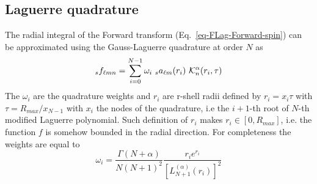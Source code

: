 \documentclass[a4paper,11pt]{article}
\begin{document}
\subsection{Laguerre quadrature}
\label{sec-Lag-quadrature}
%
The radial integral of the Forward transform (Eq.~\ref{eq-FLag-Forward-spin}) can be approximated using the Gauss-Laguerre quadrature at order $N$ as 
\begin{equation}
{}_s f_{\ell m n} = \sum_{i=0}^{N-1} \omega_i\ {}_s a_{\ell m}(r_i)\ {\cal K}^\alpha_n(r_i,\tau)
\label{eq-Lag-analyse-quadra}
\end{equation}
The $\omega_i$ are the quadrature weights and $r_i$ are r-shell radii defined by $r_i = x_i \tau$ with $\tau = R_{max}/x_{N-1}$ with $x_i$ the  nodes of the quadrature, i.e the $i+1$-th root of $N$-th  modified Laguerre polynomial. Such definition of $r_i$ makes $r_i \in [0, R_{max}]$, i.e. the function $f$ is somehow bounded in the radial direction. For completeness the weights are equal to
\begin{equation}
\omega_i = \frac{\Gamma(N+\alpha)}{N(N+1)^2} \frac{r_i e^{r_i}}{[L^{(\alpha)}_{N+1}(r_i)]^2}
\end{equation}

\end{document}
